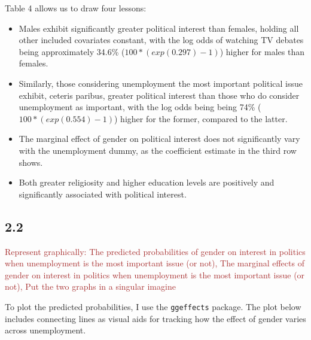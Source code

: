 \documentclass[
]{article}
\begin{document}
Table 4 allows us to draw four lessons:

\begin{itemize}
\item
  Males exhibit significantly greater political interest than females,
  holding all other included covariates constant, with the log odds of
  watching TV debates being approximately 34.6\%
  (\(100*(exp(0.297)-1)\)) higher for males than females.
\item
  Similarly, those considering unemployment the most important political
  issue exhibit, ceteris paribus, greater political interest than those
  who do consider unemployment as important, with the log odds being
  being 74\% (\(100*(exp(0.554)-1)\)) higher for the former, compared to
  the latter.
\item
  The marginal effect of gender on political interest does not
  significantly vary with the unemployment dummy, as the coefficient
  estimate in the third row shows.
\item
  Both greater religiosity and higher education levels are positively
  and significantly associated with political interest.
\end{itemize}

\hypertarget{section-4}{%
\subsection{2.2}\label{section-4}}

\textcolor{brown}{Represent graphically: The predicted probabilities of gender on interest in politics when unemployment is the most important issue (or not), The marginal effects of gender on interest in politics when unemployment is the most important issue (or not), Put the two graphs in a singular imagine}

To plot the predicted probabilities, I use the \texttt{ggeffects}
package. The plot below includes connecting lines as visual aids for
tracking how the effect of gender varies across unemployment.
\end{document}

